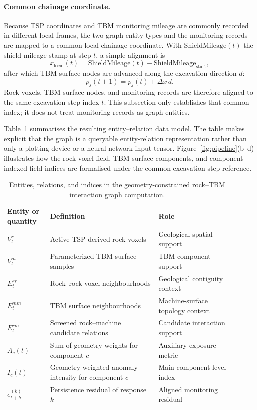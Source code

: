 \paragraph{Common chainage coordinate.} Because TSP coordinates and TBM
monitoring mileage are commonly recorded in different local frames, the two
graph entity types and the monitoring records are mapped to a common local
chainage coordinate. With
$\mathrm{ShieldMileage}(t)$ the shield mileage stamp at step $t$, a simple
alignment is
\[
x_{\mathrm{local}}(t)=
\mathrm{ShieldMileage}(t)-\mathrm{ShieldMileage}_{\mathrm{start}},
\]
after which TBM surface nodes are advanced along the excavation direction
$d$:
\[
p_j(t+1)=p_j(t)+\Delta x\,d .
\]
Rock voxels, TBM surface nodes, and monitoring records are therefore aligned
to the same excavation-step index $t$. This subsection only establishes that
common index; it does not treat monitoring records as graph entities.

Table~\ref{tab:spatial_entities_relations} summarises the resulting
entity--relation data model. The table makes explicit that the graph is a queryable
entity-relation representation rather than only a plotting device or a
neural-network input tensor. Figure~\ref{fig:pipeline}(b--d) illustrates how
the rock voxel field, TBM surface components, and component-indexed field
indices are formalised under the common excavation-step reference.

\begin{table}[htbp]
\centering
\caption{Entities, relations, and indices in the geometry-constrained rock--TBM interaction
graph computation.}
\label{tab:spatial_entities_relations}
\scriptsize
\setlength{\tabcolsep}{3pt}
\begin{tabular}{p{0.17\linewidth}p{0.43\linewidth}p{0.30\linewidth}}
\toprule
Entity or quantity & Definition & Role \\
\midrule
$V_t^r$ & Active TSP-derived rock voxels & Geological spatial support \\
$V_t^m$ & Parameterized TBM surface samples & TBM component support \\
$E_t^{rr}$ & Rock--rock voxel neighbourhoods & Geological contiguity context \\
$E_t^{mm}$ & TBM surface neighbourhoods & Machine-surface topology context \\
$E_t^{rm}$ & Screened rock--machine candidate relations & Candidate interaction support \\
$A_c(t)$ & Sum of geometry weights for component $c$ & Auxiliary exposure metric \\
$I_c(t)$ & Geometry-weighted anomaly intensity for component $c$ & Main component-level index \\
$e_{t+h}^{(k)}$ & Persistence residual of response $k$ & Aligned monitoring residual \\
\bottomrule
\end{tabular}
\end{table}

